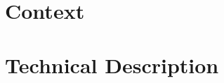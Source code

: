 \documentclass[12pt,a4paper,oneside]{book}
\begin{document}
\pagestyle{plain}

\frontmatter

\pagestyle{fancy}

\titlepage\ \endtitlepage




\tableofcontents
\listoffigures
\listoftables



\mainmatter



\chapter{Context}

\chapter{Technical Description}



\backmatter

\nocite{bi:ls,dwtk,eis:dlbi,eis:psu,pprog:pagp,ei:lead,
	erasmus:stats2010,saiku,gi:dw,site:ldm,site:osbi,php:daemons,php:pivott,
	infoq:wcag:ajax,w3c:wcag2}



\appendix


\end{document}
